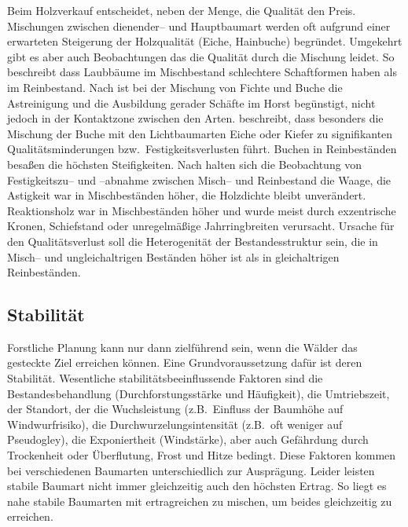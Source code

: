 \documentclass[twocolumn]{scrartcl}
\begin{document}
Beim Holzverkauf entscheidet, neben der Menge, die Qualität den
Preis. Mischungen zwischen dienender-- und Hauptbaumart werden oft
aufgrund einer erwarteten Steigerung der Holzqualität (Eiche,
Hainbuche) begründet. Umgekehrt gibt es aber auch Beobachtungen das
die Qualität durch die Mischung leidet. So beschreibt
\cite{burger1925plenterwald} dass Laubbäume im Mischbestand
schlechtere Schaftformen haben als im Reinbestand. Nach
\cite{tiebel2016qualitaet} ist bei der Mischung von Fichte und Buche
die Astreinigung und die Ausbildung gerader Schäfte im Horst
begünstigt, nicht jedoch in der Kontaktzone zwischen den
Arten. \cite{rais2019MischungQualitaet} beschreibt, dass besonders die
Mischung der Buche mit den Lichtbaumarten Eiche oder Kiefer zu
signifikanten Qualitätsminderungen bzw.\ Festigkeitsverlusten
führt. Buchen in Reinbeständen besaßen die höchsten
Steifigkeiten. Nach \cite{pretzsch2016holzqualitaetMischRein} halten
sich die Beobachtung von Festigkeitszu-- und --abnahme zwischen
Misch-- und Reinbestand die Waage, die Astigkeit war in Mischbeständen
höher, die Holzdichte bleibt unverändert. Reaktionsholz war in
Mischbeständen höher und wurde meist durch exzentrische Kronen,
Schiefstand oder unregelmäßige Jahrringbreiten verursacht. Ursache für
den Qualitätsverlust soll die Heterogenität der Bestandesstruktur
sein, die in Misch-- und ungleichaltrigen Beständen höher ist als in
gleichaltrigen Reinbeständen.

\subsection{Stabilität}
\label{ssec:stabilitaet}

Forstliche Planung kann nur dann zielführend sein, wenn die Wälder das
gesteckte Ziel erreichen können. Eine Grundvoraussetzung dafür ist
deren Stabilität. Wesentliche stabilitätsbeeinflussende Faktoren sind
die Bestandesbehandlung (Durchforstungsstärke und Häufigkeit), die
Umtriebszeit, der Standort, der die Wuchsleistung (z.B.\ Einfluss der
Baumhöhe auf Windwurfrisiko), die Durchwurzelungsintensität (z.B.\ oft
weniger auf Pseudogley), die Exponiertheit (Windstärke), aber auch
Gefährdung durch Trockenheit oder Überflutung, Frost und Hitze
bedingt. Diese Faktoren kommen bei verschiedenen Baumarten
unterschiedlich zur Ausprägung. Leider leisten stabile Baumart nicht
immer gleichzeitig auch den höchsten Ertrag. So liegt es nahe stabile
Baumarten mit ertragreichen zu mischen, um beides gleichzeitig zu
erreichen.
\end{document}
